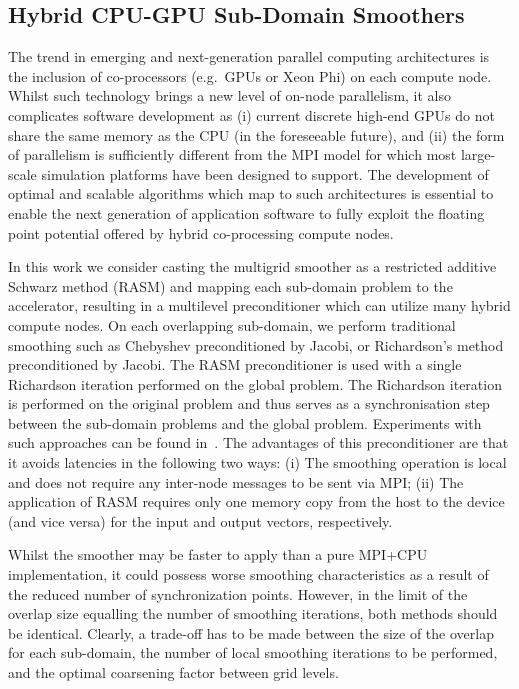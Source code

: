 \documentclass[]{siamart0216}
\begin{document}
\subsection{Hybrid CPU-GPU Sub-Domain Smoothers}
The trend in emerging and next-generation parallel computing architectures is the 
inclusion of co-processors (e.g.~GPUs or Xeon Phi) on each compute node. 
Whilst such technology brings a new level of on-node parallelism, it also complicates 
software development as (i) current discrete high-end GPUs do not share the same 
memory as the CPU (in the foreseeable future), 
and (ii) the form of parallelism is sufficiently different from the MPI model 
for which most large-scale simulation platforms have been designed to support. 
The development of optimal and scalable algorithms which map to such architectures is 
essential to enable the next generation of application software to fully exploit the floating point potential 
offered by hybrid co-processing compute nodes.



In this work we consider casting the multigrid smoother as a restricted additive Schwarz method (RASM) and mapping each sub-domain problem to the accelerator,
resulting in a multilevel preconditioner which can utilize many hybrid compute nodes. 
On each overlapping sub-domain, we perform traditional smoothing such as Chebyshev preconditioned by Jacobi, or Richardson's method  preconditioned by Jacobi.
The RASM preconditioner is used with a single Richardson iteration performed on the global problem. 
The Richardson iteration is performed on the original problem and thus serves as a synchronisation step between the 
sub-domain problems and the global problem. Experiments with such approaches can be found in~\cite{luo2011scalable}.
The  advantages of this preconditioner are that it avoids latencies in the following two ways: 
(i) The smoothing operation is local and does not require any inter-node messages to be sent via MPI; 
(ii) The application of RASM requires only one memory copy from the host to the device (and vice versa) for the input and output 
vectors, respectively.


Whilst the smoother may be faster to apply than a pure MPI+CPU implementation, it could possess worse 
smoothing characteristics as a result of the reduced number of synchronization points. 
However, in the limit of the overlap size equalling the number of smoothing iterations, both methods should be identical.
Clearly, a trade-off has to be made between the size of the overlap for each sub-domain, the number of local smoothing 
iterations to be performed, and the optimal coarsening factor between grid levels.
\end{document}
